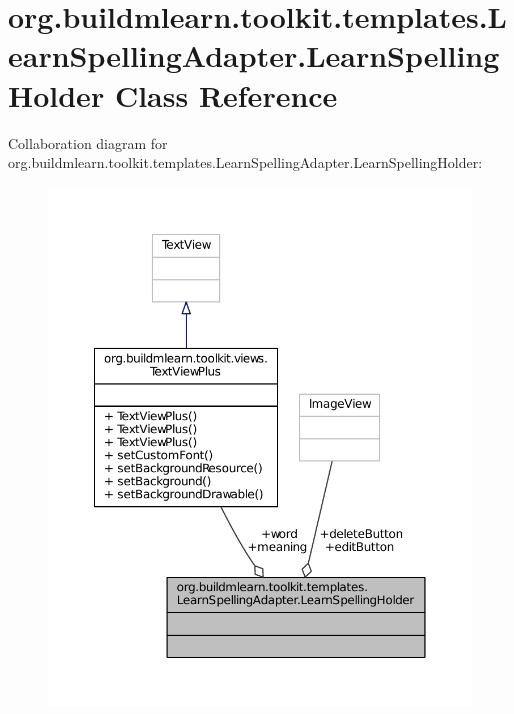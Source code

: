 \hypertarget{classorg_1_1buildmlearn_1_1toolkit_1_1templates_1_1LearnSpellingAdapter_1_1LearnSpellingHolder}{\section{org.\-buildmlearn.\-toolkit.\-templates.\-Learn\-Spelling\-Adapter.\-Learn\-Spelling\-Holder Class Reference}
\label{classorg_1_1buildmlearn_1_1toolkit_1_1templates_1_1LearnSpellingAdapter_1_1LearnSpellingHolder}
}


Collaboration diagram for org.\-buildmlearn.\-toolkit.\-templates.\-Learn\-Spelling\-Adapter.\-Learn\-Spelling\-Holder\-:
\nopagebreak
\begin{figure}[H]
\begin{center}
\leavevmode
\includegraphics[width=350pt]{d4/df5/classorg_1_1buildmlearn_1_1toolkit_1_1templates_1_1LearnSpellingAdapter_1_1LearnSpellingHolder__coll__graph}
\end{center}
\end{figure}
